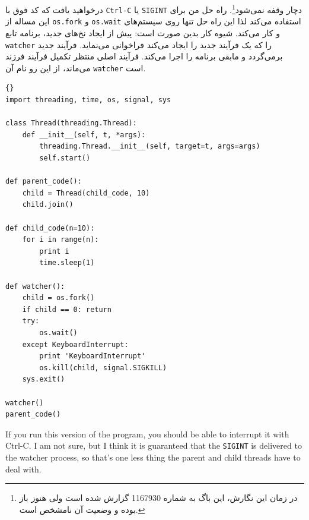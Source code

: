 \documentclass{book}
\begin{document}
    درخواهید یافت که کد فوق با {\tt Ctrl-C} یا {\tt SIGINT} دچار وقفه نمی‌شود\footnote{
    در زمان این نگارش، این باگ به شماره 1167930 گزارش شده است ولی هنوز باز بوده و وضعیت آن نامشخص است.  
    }.
    راه حل من برای این مساله از {\tt os.fork} و {\tt os.wait} استفاده می‌کند لذا این راه حل تنها روی سیستم‌های  و  
    کار می‌کند. شیوه کار بدین صورت است:‌ پیش از ایجاد نخ‌های جدید، برنامه  تابع  {\tt watcher} را که یک فرآیند جدید را ایجاد می‌کند فراخوانی می‌نماید. 
    فرآیند جدید برمی‌گردد و  مابقی برنامه را اجرا می‌کند. 
    فرآیند اصلی منتظر تکمیل فرآیند فرزند می‌ماند، از این رو نام آن   {\tt watcher} است. 
    

\begin{latin}
\begin{lstlisting}[title={The watcher}]{}
import threading, time, os, signal, sys

class Thread(threading.Thread):
    def __init__(self, t, *args):
        threading.Thread.__init__(self, target=t, args=args)
        self.start()

def parent_code():
    child = Thread(child_code, 10)
    child.join()

def child_code(n=10):
    for i in range(n):
        print i
        time.sleep(1)

def watcher():
    child = os.fork()
    if child == 0: return
    try:
        os.wait()
    except KeyboardInterrupt:
        print 'KeyboardInterrupt'
        os.kill(child, signal.SIGKILL)
    sys.exit()

watcher()
parent_code()
\end{lstlisting}
\end{latin}


If you run this version of the program, you should be able
to interrupt it with Ctrl-C.  I am not sure, but I think it
is guaranteed that the {\tt SIGINT} is delivered to the
watcher process, so that's one less thing the
parent and child threads have to deal with.
\end{document}
